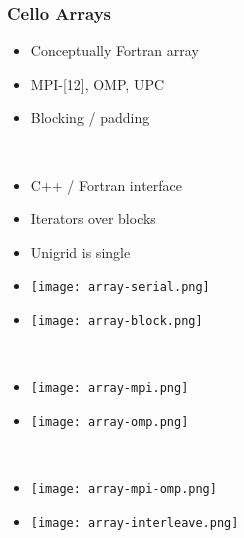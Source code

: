 
\begin{frame}
\frametitle{Cello Arrays}
\begin{minipage}{2.0in}
\begin{itemize}
\item Conceptually Fortran array
\item MPI-[12], OMP, UPC
\item Blocking / padding
\end{itemize}
\end{minipage} \ 
\begin{minipage}{2.0in}
\begin{itemize}
\item C++ / Fortran interface
\item Iterators over blocks
\item Unigrid is single 
\end{itemize}
\end{minipage}
\begin{minipage}{1.3in}
\vspace{0.1in}
\begin{itemize}
\item[]\texttt{[image: array-serial.png]} \ \ 
\item[]\texttt{[image: array-block.png]} \ \ \code{ArrayBlock}
\end{itemize}
\end{minipage} \ 
\begin{minipage}{1.3in}
\vspace{0.1in}
\begin{itemize}
\item[]\texttt{[image: array-mpi.png]} \ \ 
\item[]\texttt{[image: array-omp.png]} \ \ 
\end{itemize}
\end{minipage} \ 
\begin{minipage}{1.3in}
\vspace{0.1in}
\begin{itemize}
\item[]\texttt{[image: array-mpi-omp.png]} \ \ 
\item[]\texttt{[image: array-interleave.png]} \ \ 
\end{itemize}
\end{minipage}

\end{frame}

